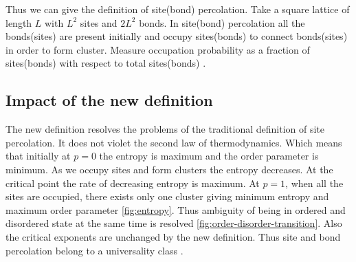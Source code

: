 	
	
		 Thus we can give the definition of site(bond) percolation. Take a square lattice of length $L$ with $L^2$ sites and $2L^2$ bonds. In site(bond) percolation all the bonds(sites) are present initially and occupy sites(bonds) to connect bonds(sites) in order to form cluster. Measure occupation probability as a fraction of sites(bonds) with respect to total sites(bonds) \cite{redefinition-of-site-percolation}.
		 
	\subsection{Impact of the new definition}
		The new definition resolves the problems of the traditional definition of site percolation. It does not violet the second law of thermodynamics. Which means that initially at $p=0$ the entropy is maximum and the order parameter is minimum. As we occupy sites and form clusters the entropy decreases. At the critical point the rate of decreasing entropy is maximum. At $p=1$, when all the sites are occupied, there exists only one cluster giving minimum entropy and maximum order parameter \ref{fig:entropy}.		Thus ambiguity of being in ordered and disordered state at the same time is resolved \ref{fig:order-disorder-transition}. Also the critical exponents are unchanged by the new definition. Thus site and bond percolation belong to a universality class \cite{Hassan2015, Hassan2016}.


